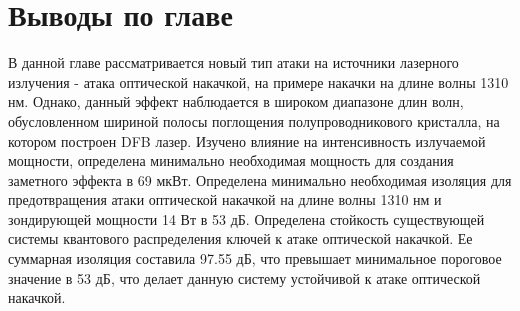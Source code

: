 \section{Выводы по главе}\label{sec:ch4/sect7}
В данной главе рассматривается новый тип атаки на источники лазерного излучения - атака оптической накачкой, на примере накачки на длине волны 1310 нм. Однако, данный эффект наблюдается в широком диапазоне длин волн, обусловленном шириной полосы поглощения полупроводникового кристалла, на котором построен DFB лазер. 
Изучено влияние на интенсивность излучаемой мощности, определена минимально необходимая мощность для создания заметного эффекта в 69 мкВт. Определена минимально необходимая изоляция для предотвращения атаки оптической накачкой на длине волны 1310 нм и зондирующей мощности 14 Вт в 53 дБ.
Определена стойкость существующей системы квантового распределения ключей к атаке оптической накачкой. Ее суммарная изоляция составила 97.55 дБ, что превышает минимальное пороговое значение в 53 дБ, что делает данную систему устойчивой к атаке оптической накачкой. 
